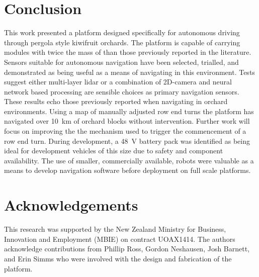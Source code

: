 \documentclass[preprint,authoryear,12pt]{elsarticle}
\begin{document}
\section{Conclusion}
    This work presented a platform designed specifically for autonomous driving through pergola style kiwifruit orchards.
    The platform is capable of carrying modules with twice the mass of than those previously reported in the literature.
    Sensors suitable for autonomous navigation have been selected, trialled, and demonstrated as being useful as a means of navigating in this environment.
    Tests suggest either multi-layer lidar or a combination of 2D-camera and neural network based processing are sensible choices as primary navigation sensors.
    These results echo those previously reported when navigating in orchard environments.
    Using a map of manually adjusted row end turns the platform has navigated over \SI{10}{\kilo\meter} of orchard blocks without intervention.
    Further work will focus on improving the the mechanism used to trigger the commencement of a row end turn.
    During development, a \SI{48}{\volt} battery pack was identified as being ideal for development vehicles of this size due to safety and component availability.
    The use of smaller, commercially available, robots were valuable as a means to develop navigation software before deployment on full scale platforms.

\section*{Acknowledgements}
This research was supported by the New Zealand Ministry for Business, Innovation and Employment (MBIE) on contract UOAX1414.
The authors acknowledge contributions from Phillip Ross, Gordon Neshausen, Josh Barnett, and Erin Simms who were involved with the design and fabrication of the platform.



\end{document}
